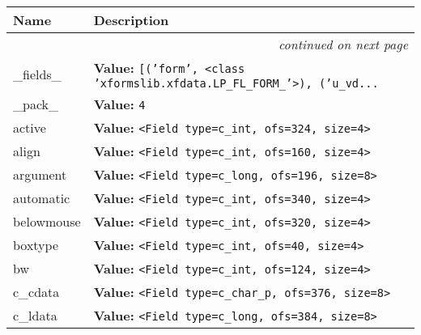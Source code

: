     \vspace{-1cm}
\hspace{\varindent}\begin{longtable}{|p{\varnamewidth}|p{\vardescrwidth}|l}
\cline{1-2}
\cline{1-2} \centering \textbf{Name} & \centering \textbf{Description}& \\
\cline{1-2}
\endhead\cline{1-2}\multicolumn{3}{r}{\small\textit{continued on next page}}\\\endfoot\cline{1-2}
\endlastfoot\raggedright \_\-f\-i\-e\-l\-d\-s\-\_\- & \raggedright \textbf{Value:} 
{\tt \texttt{[}\texttt{(}\texttt{'}\texttt{form}\texttt{'}\texttt{, }{\textless}class 'xformslib.xfdata.LP\_FL\_FORM\_'{\textgreater}\texttt{)}\texttt{, }\texttt{(}\texttt{'}\texttt{u\_vd}\texttt{...}}&\\
\cline{1-2}
\raggedright \_\-p\-a\-c\-k\-\_\- & \raggedright \textbf{Value:} 
{\tt 4}&\\
\cline{1-2}
\raggedright a\-c\-t\-i\-v\-e\- & \raggedright \textbf{Value:} 
{\tt {\textless}Field type=c\_int, ofs=324, size=4{\textgreater}}&\\
\cline{1-2}
\raggedright a\-l\-i\-g\-n\- & \raggedright \textbf{Value:} 
{\tt {\textless}Field type=c\_int, ofs=160, size=4{\textgreater}}&\\
\cline{1-2}
\raggedright a\-r\-g\-u\-m\-e\-n\-t\- & \raggedright \textbf{Value:} 
{\tt {\textless}Field type=c\_long, ofs=196, size=8{\textgreater}}&\\
\cline{1-2}
\raggedright a\-u\-t\-o\-m\-a\-t\-i\-c\- & \raggedright \textbf{Value:} 
{\tt {\textless}Field type=c\_int, ofs=340, size=4{\textgreater}}&\\
\cline{1-2}
\raggedright b\-e\-l\-o\-w\-m\-o\-u\-s\-e\- & \raggedright \textbf{Value:} 
{\tt {\textless}Field type=c\_int, ofs=320, size=4{\textgreater}}&\\
\cline{1-2}
\raggedright b\-o\-x\-t\-y\-p\-e\- & \raggedright \textbf{Value:} 
{\tt {\textless}Field type=c\_int, ofs=40, size=4{\textgreater}}&\\
\cline{1-2}
\raggedright b\-w\- & \raggedright \textbf{Value:} 
{\tt {\textless}Field type=c\_int, ofs=124, size=4{\textgreater}}&\\
\cline{1-2}
\raggedright c\-\_\-c\-d\-a\-t\-a\- & \raggedright \textbf{Value:} 
{\tt {\textless}Field type=c\_char\_p, ofs=376, size=8{\textgreater}}&\\
\cline{1-2}
\raggedright c\-\_\-l\-d\-a\-t\-a\- & \raggedright \textbf{Value:} 
{\tt {\textless}Field type=c\_long, ofs=384, size=8{\textgreater}}&\\

\end{longtable}
